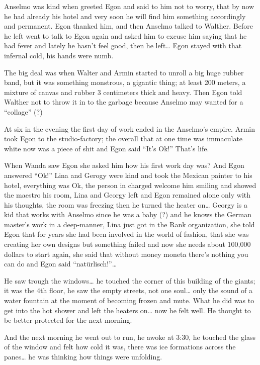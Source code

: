\documentclass[smalldemyvopaper,11pt,twoside,onecolumn,openright,extrafontsizes]{memoir}
\begin{document}
Anselmo was kind when greeted Egon and said to him not to worry, that by now he had already his hotel and very soon he will find him something accordingly and permanent. Egon thanked him, and then Anselmo talked to Walther. Before he left went to talk to Egon again and asked him to excuse him saying that he had fever and lately he hasn’t feel good, then he left… Egon stayed with that infernal cold, his hands were numb. 

The big deal was when Walter and Armin started to unroll a big huge rubber band, but it was something monstrous, a gigantic thing; at least 200 meters, a mixture of canvas and rubber 3 centimeters thick and heavy. Then Egon told Walther not to throw it in to the garbage because Anselmo may wanted for a “collage” (?)

At six in the evening the first day of work ended in the Anselmo’s empire. Armin took Egon to the studio-factory; the overall that at one time was immaculate white now was a piece of shit and Egon said “It’s Ok!” That’s life.

When Wanda saw Egon she asked him how his first work day was? And Egon answered “Ok!” Lina and Gerogy were kind and took the Mexican painter to his hotel, everything was Ok, the person in charged welcome him smiling and showed the maestro his room, Lina and Georgy left and Egon remained alone only with his thoughts, the room was freezing then he turned the heater on… Georgy is a kid that works with Anselmo since he was a baby (?) and he knows the German master’s work in a deep-manner, Lina just got in the Rank organization, she told Egon that for years she had been involved in the world of fashion, that she was creating her own designs but something failed and now she needs about 100,000 dollars to start again, she said that without money moneta there’s nothing you can do and Egon said “natürlisch!”…

\ornamentbreak

He saw trough the windows… he touched the corner of this building of the giants; it was the 4th floor, he saw the empty streets, not one soul… only the sound of a water fountain at the moment of becoming frozen and mute. What he did was to get into the hot shower and left the heaters on… now he felt well. He thought to be better protected for the next morning.

And the next morning he went out to run, he awoke at 3:30, he touched the glass of the window and felt how cold it was, there was ice formations across the panes… he was thinking how things were unfolding.
\end{document}
